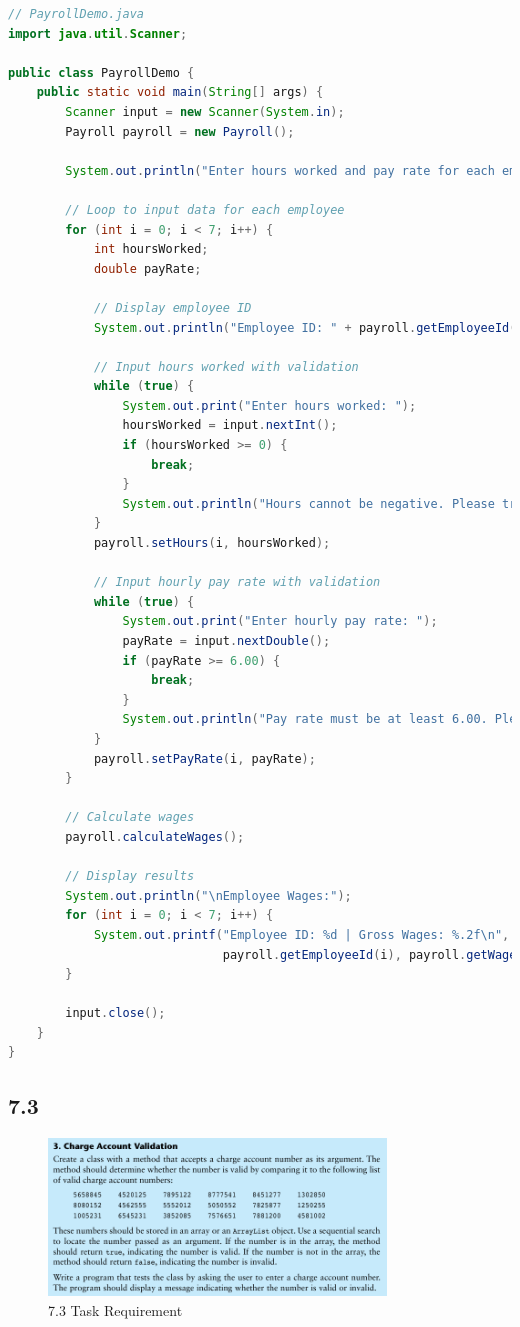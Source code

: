 \documentclass{article}
\begin{document}
\begin{lstlisting}[language=Java, caption=PayrollDemo.java]
// PayrollDemo.java
import java.util.Scanner;

public class PayrollDemo {
    public static void main(String[] args) {
        Scanner input = new Scanner(System.in);
        Payroll payroll = new Payroll();

        System.out.println("Enter hours worked and pay rate for each employee:");

        // Loop to input data for each employee
        for (int i = 0; i < 7; i++) {
            int hoursWorked;
            double payRate;

            // Display employee ID
            System.out.println("Employee ID: " + payroll.getEmployeeId(i));

            // Input hours worked with validation
            while (true) {
                System.out.print("Enter hours worked: ");
                hoursWorked = input.nextInt();
                if (hoursWorked >= 0) {
                    break;
                }
                System.out.println("Hours cannot be negative. Please try again.");
            }
            payroll.setHours(i, hoursWorked);

            // Input hourly pay rate with validation
            while (true) {
                System.out.print("Enter hourly pay rate: ");
                payRate = input.nextDouble();
                if (payRate >= 6.00) {
                    break;
                }
                System.out.println("Pay rate must be at least 6.00. Please try again.");
            }
            payroll.setPayRate(i, payRate);
        }

        // Calculate wages
        payroll.calculateWages();

        // Display results
        System.out.println("\nEmployee Wages:");
        for (int i = 0; i < 7; i++) {
            System.out.printf("Employee ID: %d | Gross Wages: %.2f\n",
                              payroll.getEmployeeId(i), payroll.getWages(i));
        }

        input.close();
    }
}
\end{lstlisting}

\subsection*{7.3}

\begin{figure}[H]
    \centering
    \includegraphics[width=0.8\textwidth]{./Assets/Task requirements/Assignment8/7.3.png}
    \caption{7.3 Task Requirement}
\end{figure}
\end{document}
